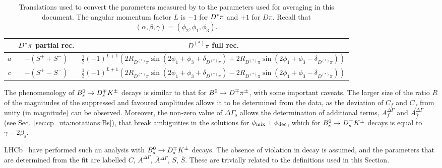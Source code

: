 \begin{table}
  \begin{center} 
    \caption{
      Translations used to convert the parameters measured by \belle
      to the parameters used for averaging in this document.
      The angular momentum factor $L$ is $-1$ for $D^*\pi$ and $+1$ for $D\pi$.
      Recall that $\left( \alpha, \beta, \gamma \right) = \left( \phi_2, \phi_1, \phi_3 \right)$.
    }
    \vspace{0.2cm}
    \setlength{\tabcolsep}{0.0pc}
    \begin{tabular*}{\textwidth}{@{\extracolsep{\fill}}ccc} \hline 
        & $D^*\pi$ partial rec. & $D^{(*)}\pi$ full rec. \\
        \hline
        $a$ & $- (S^+ + S^-)$ &
        $\frac{1}{2} (-1)^{L+1}
        \left(
          2 R_{D^{(*)}\pi} \sin( 2\phi_1 + \phi_3 + \delta_{D^{(*)}\pi} ) + 
          2 R_{D^{(*)}\pi} \sin( 2\phi_1 + \phi_3 - \delta_{D^{(*)}\pi} )
        \right)$ \\
        $c$ & $- (S^+ - S^-)$ & 
        $\frac{1}{2} (-1)^{L+1}
        \left(
          2 R_{D^{(*)}\pi} \sin( 2\phi_1 + \phi_3 + \delta_{D^{(*)}\pi} ) -
          2 R_{D^{(*)}\pi} \sin( 2\phi_1 + \phi_3 - \delta_{D^{(*)}\pi} )
        \right)$ \\
        \hline 
      \end{tabular*}
    \label{tab:cp_uta:notations:non_cp:dstarpi2}
  \end{center}
\end{table}

\label{sec:cp_uta:notations:non_cp:dsk}

The phenomenology of $B^0_s \to D_s^{\mp}K^\pm$ decays is similar to that for $B^0 \to D^{\mp}\pi^{\pm}$, with some important caveats.
The larger size of the ratio $R$ of the magnitudes of the suppressed and favoured amplitudes allows it to be determined from the data, as the deviation of $C_f$ and $C_{\bar{f}}$ from unity (in magnitude) can be observed.
Moreover, the non-zero value of $\Delta \Gamma_s$ allows the determination of additional terms, $A^{\Delta\Gamma}_f$ and $A^{\Delta\Gamma}_{\bar{f}}$ (see Sec.~\ref{sec:cp_uta:notations:Bs}), that break ambiguities in the solutions for $\phi_{\rm mix} + \phi_{\rm dec}$, which for $B^0_s \to D_s^{\mp}K^\pm$ decays is equal to $\gamma-2\beta_s$.

LHCb~\cite{Aaij:2014fba} have performed such an analysis with $B^0_s \to D_s^{\mp}K^\pm$ decays.
The absence of \CP violation in decay is assumed, and the parameters that are determined from the fit are labelled $C$, $A^{\Delta\Gamma}$, $\bar{A}{}^{\Delta\Gamma}$, $S$, $\bar{S}$.
These are trivially related to the definitions used in this Section.

